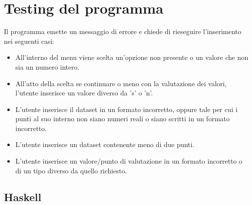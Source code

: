 \documentclass[11pt]{article}
\theoremstyle{definition}
\begin{document}
\section{Testing del programma}
Il programma emette un messaggio di errore e chiede di rieseguire l'inserimento nei seguenti casi:
\begin{itemize}
\item All'interno del menu viene scelta un'opzione non presente o un valore che non sia un numero intero.
\item All'atto della scelta se continuare o meno con la valutazione dei valori, l'utente inserisce un valore diverso da 's' o 'n'.
\item L'utente inserisce il dataset in un formato incorretto, oppure tale per cui i punti al suo interno non siano numeri reali o siano scritti in un formato incorretto.
\item L'utente inserisce un dataset contenente meno di due punti.
\item L'utente inserisce un valore/punto di valutazione in un formato incorretto o di un tipo diverso da quello richiesto.
\end{itemize}

\subsection{Haskell}
\end{document}
